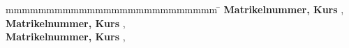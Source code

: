 \begin{titlepage}
\vfill

\begin{spacing}{1.2}
	\begin{tabbing}
		mmmmmmmmmmmmmmmmmmmmmmmmmm \= \kill
		\textbf{Matrikelnummer, Kurs} \> \matriculationNumberOne, \course \\
		\textbf{Matrikelnummer, Kurs} \> \matriculationNumberTwo, \course \\
		\textbf{Matrikelnummer, Kurs} \> \matriculationNumberThree, \course \\
	\end{tabbing}
\end{spacing}
\end{titlepage}

